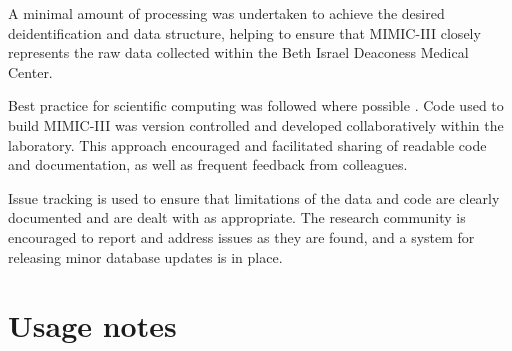 \documentclass[english]{article}
\begin{document}
A minimal amount of processing was undertaken to achieve the desired deidentification and data structure, helping to ensure that MIMIC-III closely represents the raw data collected within the Beth Israel Deaconess Medical Center.

Best practice for scientific computing was followed where possible \cite{cite4}. Code used to build MIMIC-III was version controlled and developed collaboratively within the laboratory. This approach encouraged and facilitated sharing of readable code and documentation, as well as frequent feedback from colleagues.

Issue tracking is used to ensure that limitations of the data and code are clearly documented and are dealt with as appropriate. The research community is encouraged to report and address issues as they are found, and a system for releasing minor database updates is in place.



\section*{Usage notes}

\end{document}

